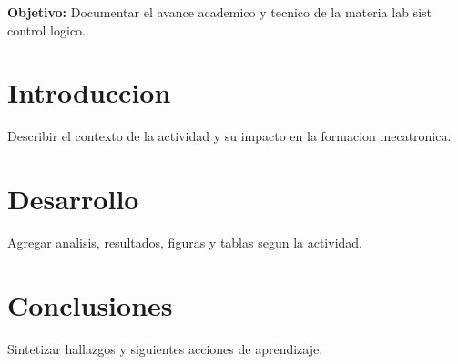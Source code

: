 \documentclass[spanish,letterpaper,oneside]{article}
\begin{document}
\templatePortrait
\templatePagecfg
\onehalfspacing

\begin{abstractd}
\textbf{Objetivo:} Documentar el avance academico y tecnico de la materia lab sist control logico.
\end{abstractd}

\templateIndex
\templateFinalcfg

\section{Introduccion}
Describir el contexto de la actividad y su impacto en la formacion mecatronica.

\section{Desarrollo}
Agregar analisis, resultados, figuras y tablas segun la actividad.

\section{Conclusiones}
Sintetizar hallazgos y siguientes acciones de aprendizaje.



\end{document}
